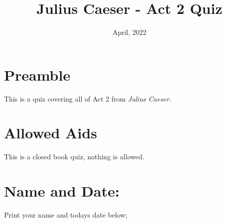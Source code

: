 \documentclass[12pt]{article} %
\title{Julius Caeser - Act 2 Quiz}
\date{April, 2022}
\begin{document}
    \renewcommand*{\coursecode}{MCR3U Quiz} %
    \renewcommand*{\assgnnumber}{2} %
    \renewcommand*{\submdate}{January, 2022} %
    \renewcommand*{\studentfname}{\textbf{Name:}} %
    \renewcommand*{\studentlname}{} %

    \renewcommand\qedsymbol{$\blacksquare$}
    \setfigpath
    \pagestyle{crowdmark}
    \fancyhfoffset[L,O]{0pt} %




	\maketitle
	\section{Preamble}
    This is a quiz covering all of Act 2 from \textit{Julius Caeser}.
	\section{Allowed Aids}
  This is a closed book quiz, nothing is allowed.
	\section{Name and Date:}
	Print your name and todays date below;
\end{document}
